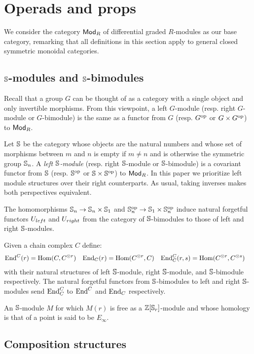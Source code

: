
\section{Operads and props} \label{s:operads and props}

We consider the category $\Ch$ of differential graded $R$-modules as our base category, remarking that all definitions in this section apply to general closed symmetric monoidal categories.

\subsection{$\S$-modules and $\S$-bimodules} \label{ss:symmetric (bi)modules}

Recall that a group $G$ can be thought of as a category with a single object and only invertible morphisms. From this viewpoint, a left $G$-module (resp. right $G$-module or $G$-bimodule) is the same as a functor from $G$ (resp. $G^\op$ or $G \times G^\op$) to $\Ch$.

Let $\S$ be the category whose objects are the natural numbers and whose set of morphisms between $m$ and $n$ is empty if $m \neq n$ and is otherwise the symmetric group $\S_n$.
A \textit{left $\S$-module} (resp. right $\S$-module or $\S$-bimodule) is a covariant functor from $\S$ (resp. $\S^\op$ or $\S \times \S^\op$) to $\Ch$.
In this paper we prioritize left module structures over their right counterparts. As usual, taking inverses makes both perspectives equivalent.

The homomorphisms $\S_n \to \S_n \times \S_1$ and $\S_n^\op \to \S_1 \times \S_n^\op$ induce natural forgetful functors $\Uleft$ and $\Uright$ from the category of $\S$-bimodules to those of left and right $\S$-modules.

Given a chain complex $C$ define:
\begin{align*}
\End^C(r) &= \Hom(C, C^{\otimes r})
& \End_C(r) &= \Hom(C^{\otimes r}, C)
&\End^C_C(r, s) &= \Hom(C^{\otimes r}, C^{\otimes s})
\end{align*}
with their natural structures of left $\S$-module, right $\S$-module, and $\S$-bimodule respectively.
The natural forgetful functors from $\S$-bimodules to left and right $\S$-modules send $\End^C_C$ to $\End^C$ and $\End_C$ respectively.

An $\S$-module $M$ for which $M(r)$ is free as a $\Z[\S_r]$-module and whose homology is that of a point is said to be $E_\infty$.

\subsection{Composition structures} \label{ss:composition structure}


